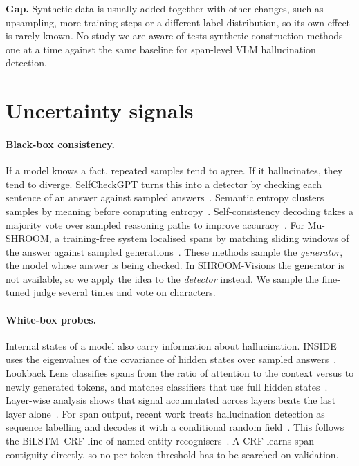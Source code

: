 \textbf{Gap.} Synthetic data is usually added together with other changes, such as upsampling, more training steps or a different label distribution, so its own effect is rarely known. No study we are aware of tests synthetic construction methods one at a time against the same baseline for span-level VLM hallucination detection.

\section{Uncertainty signals}

\paragraph{Black-box consistency.}
If a model knows a fact, repeated samples tend to agree. If it hallucinates, they tend to diverge. SelfCheckGPT turns this into a detector by checking each sentence of an answer against sampled answers~\cite{manakul2023selfcheckgpt}. Semantic entropy clusters samples by meaning before computing entropy~\cite{kuhn2023semantic,farquhar2024semantic}. Self-consistency decoding takes a majority vote over sampled reasoning paths to improve accuracy~\cite{wang2023selfconsistency}. For Mu-SHROOM, a training-free system localised spans by matching sliding windows of the answer against sampled generations~\cite{vemula2025keepitsimple}. These methods sample the \emph{generator}, the model whose answer is being checked. In SHROOM-Visions the generator is not available, so we apply the idea to the \emph{detector} instead. We sample the fine-tuned judge several times and vote on characters.

\paragraph{White-box probes.}
Internal states of a model also carry information about hallucination. INSIDE uses the eigenvalues of the covariance of hidden states over sampled answers~\cite{chen2024inside}. Lookback Lens classifies spans from the ratio of attention to the context versus to newly generated tokens, and matches classifiers that use full hidden states~\cite{chuang2024lookback}. Layer-wise analysis shows that signal accumulated across layers beats the last layer alone~\cite{kim2025layerwise}. For span output, recent work treats hallucination detection as sequence labelling and decodes it with a conditional random field~\cite{lafferty2001crf,itkin2026temporal}. This follows the BiLSTM--CRF line of named-entity recognisers~\cite{huang2015bilstmcrf,lample2016neural}. A CRF learns span contiguity directly, so no per-token threshold has to be searched on validation.

